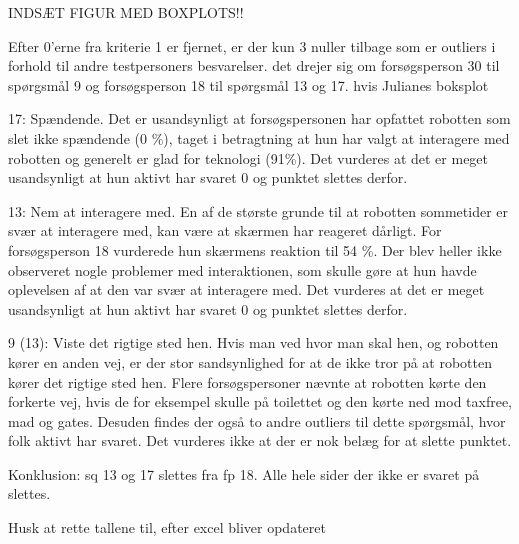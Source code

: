INDSÆT FIGUR MED BOXPLOTS!!

Efter 0'erne fra kriterie 1 er fjernet, er der kun 3 nuller tilbage som er outliers i forhold til andre testpersoners besvarelser. det drejer sig om forsøgsperson 30 til spørgsmål 9 og forsøgsperson 18 til spørgsmål 13 og 17. 
hvis Julianes boksplot

17: Spændende. Det er usandsynligt at forsøgspersonen har opfattet robotten som slet ikke spændende (0 \%), taget i betragtning at hun har valgt at interagere med robotten og generelt er glad for teknologi (91\%). Det vurderes at det er meget usandsynligt at hun aktivt har svaret 0 og punktet slettes derfor.

13: Nem at interagere med. En af de største grunde til at robotten sommetider er svær at interagere med, kan være at skærmen har reageret dårligt. For forsøgsperson 18 vurderede hun skærmens reaktion til 54 \%. Der blev heller ikke observeret nogle problemer med interaktionen, som skulle gøre at hun havde oplevelsen af at den var svær at interagere med. Det vurderes at det er meget usandsynligt at hun aktivt har svaret 0 og punktet slettes derfor.

9 (13): Viste det rigtige sted hen. Hvis man ved hvor man skal hen, og robotten kører en anden vej, er der stor sandsynlighed for at de ikke tror på at robotten kører det rigtige sted hen. Flere forsøgspersoner nævnte at robotten kørte den forkerte vej, hvis de for eksempel skulle på toilettet og den kørte ned mod taxfree, mad og gates. Desuden findes der også to andre outliers til dette spørgsmål, hvor folk aktivt har svaret. Det vurderes ikke at der er nok belæg for at slette punktet.

Konklusion: sq 13 og 17 slettes fra fp 18. Alle hele sider der ikke er svaret på slettes. 

Husk at rette tallene til, efter excel bliver opdateret